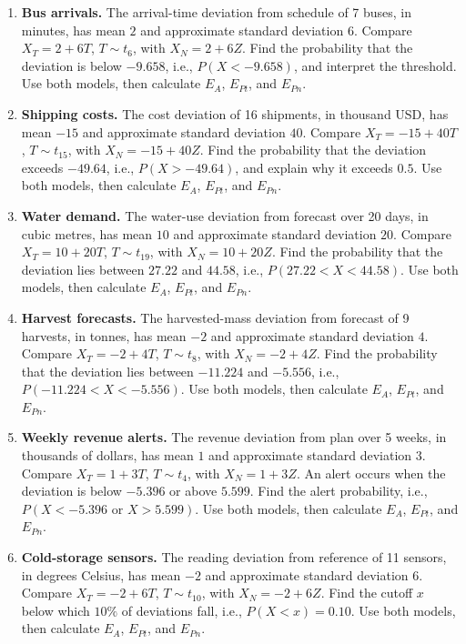 	\begin{enumerate}[leftmargin=*,label=\textbf{\arabic*.},itemsep=5pt,parsep=0pt,topsep=2pt]
		\item \textbf{Bus arrivals.} The arrival-time deviation from schedule of 7 buses, in minutes, has mean $2$ and approximate standard deviation $6$. Compare $X_T=2+6T$, $T\sim t_{6}$, with $X_N=2+6Z$. Find the probability that the deviation is below $-9.658$, i.e., $P(X<-9.658)$, and interpret the threshold. Use both models, then calculate $E_A$, $E_{Pt}$, and $E_{Pn}$.
		\item \textbf{Shipping costs.} The cost deviation of 16 shipments, in thousand USD, has mean $-15$ and approximate standard deviation $40$. Compare $X_T=-15+40T$, $T\sim t_{15}$, with $X_N=-15+40Z$. Find the probability that the deviation exceeds $-49.64$, i.e., $P(X>-49.64)$, and explain why it exceeds $0.5$. Use both models, then calculate $E_A$, $E_{Pt}$, and $E_{Pn}$.
		\item \textbf{Water demand.} The water-use deviation from forecast over 20 days, in cubic metres, has mean $10$ and approximate standard deviation $20$. Compare $X_T=10+20T$, $T\sim t_{19}$, with $X_N=10+20Z$. Find the probability that the deviation lies between $27.22$ and $44.58$, i.e., $P(27.22<X<44.58)$. Use both models, then calculate $E_A$, $E_{Pt}$, and $E_{Pn}$.
		\item \textbf{Harvest forecasts.} The harvested-mass deviation from forecast of 9 harvests, in tonnes, has mean $-2$ and approximate standard deviation $4$. Compare $X_T=-2+4T$, $T\sim t_{8}$, with $X_N=-2+4Z$. Find the probability that the deviation lies between $-11.224$ and $-5.556$, i.e., $P(-11.224<X<-5.556)$. Use both models, then calculate $E_A$, $E_{Pt}$, and $E_{Pn}$.
		\item \textbf{Weekly revenue alerts.} The revenue deviation from plan over 5 weeks, in thousands of dollars, has mean $1$ and approximate standard deviation $3$. Compare $X_T=1+3T$, $T\sim t_{4}$, with $X_N=1+3Z$. An alert occurs when the deviation is below $-5.396$ or above $5.599$. Find the alert probability, i.e., $P(X<-5.396\text{ or }X>5.599)$. Use both models, then calculate $E_A$, $E_{Pt}$, and $E_{Pn}$.
		\item \textbf{Cold-storage sensors.} The reading deviation from reference of 11 sensors, in degrees Celsius, has mean $-2$ and approximate standard deviation $6$. Compare $X_T=-2+6T$, $T\sim t_{10}$, with $X_N=-2+6Z$. Find the cutoff $x$ below which $10\%$ of deviations fall, i.e., $P(X<x)=0.10$. Use both models, then calculate $E_A$, $E_{Pt}$, and $E_{Pn}$.

\end{enumerate}
